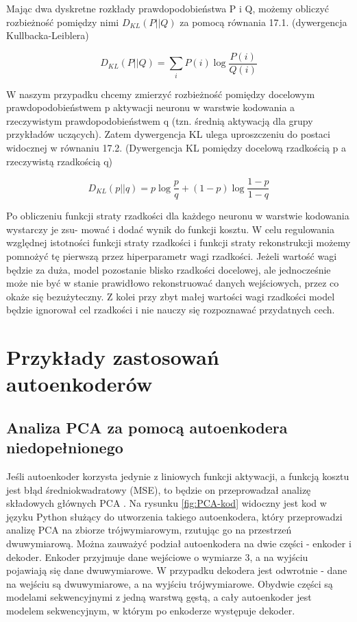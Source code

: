 \documentclass[12pt]{mwbk}
\theoremstyle{plain}
\theoremstyle{definition}
\theoremstyle{remark}
\begin{document}
Mając dwa dyskretne rozkłady prawdopodobieństwa P i Q, możemy obliczyć rozbieżność pomiędzy nimi $D_{KL}(P||Q)$ za pomocą równania 17.1. (dywergencja Kullbacka-Leiblera)

$$D_{KL}(P||Q)=\sum_i P(i)\log \frac{P(i)}{Q(i)}$$

W naszym przypadku chcemy zmierzyć rozbieżność pomiędzy docelowym prawdopodobieństwem p
aktywacji neuronu w warstwie kodowania a rzeczywistym prawdopodobieństwem q (tzn. średnią
aktywacją dla grupy przykładów uczących). Zatem dywergencja KL ulega uproszczeniu do postaci
widocznej w równaniu 17.2. (Dywergencja KL pomiędzy docelową rzadkością p a rzeczywistą rzadkością q)

$$D_{KL}(p||q)=p\log \frac{p}{q}+(1-p)\log \frac{1-p}{1-q}$$

Po obliczeniu funkcji straty rzadkości dla każdego neuronu w warstwie kodowania wystarczy je zsu-
mować i dodać wynik do funkcji kosztu. W celu regulowania względnej istotności funkcji straty
rzadkości i funkcji straty rekonstrukcji możemy pomnożyć tę pierwszą przez hiperparametr wagi
rzadkości. Jeżeli wartość wagi będzie za duża, model pozostanie blisko rzadkości docelowej, ale
jednocześnie może nie być w stanie prawidłowo rekonstruować danych wejściowych, przez co okaże się bezużyteczny. Z kolei przy zbyt małej wartości wagi rzadkości model będzie ignorował cel rzadkości
i nie nauczy się rozpoznawać przydatnych cech.




\chapter{Przykłady zastosowań autoenkoderów}

\section{Analiza PCA za pomocą autoenkodera niedopełnionego}

Jeśli autoenkoder korzysta jedynie z liniowych funkcji aktywacji, a funkcją kosztu jest  błąd średniokwadratowy (MSE), to będzie on przeprowadzał analizę składowych głównych PCA \cite{geron}. Na rysunku \ref{fig:PCA-kod} widoczny jest kod w języku Python służący do utworzenia takiego autoenkodera, który przeprowadzi analizę PCA na zbiorze trójwymiarowym, rzutując go na przestrzeń dwuwymiarową. Można zauważyć podział autoenkodera na dwie części - enkoder i dekoder. Enkoder przyjmuje dane wejściowe o wymiarze 3, a na wyjściu pojawiają się dane dwuwymiarowe. W przypadku dekodera jest odwrotnie - dane na wejściu są dwuwymiarowe, a na wyjściu trójwymiarowe. Obydwie części są modelami sekwencyjnymi z jedną warstwą gęstą, a cały autoenkoder jest modelem sekwencyjnym, w którym po enkoderze występuje dekoder.
\end{document}
